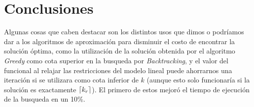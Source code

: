 \section{Conclusiones}

Algunas cosas que caben destacar son los distintos usos que dimos o podr\'iamos
dar a los algoritmos de aproximaci\'on para disminuir el costo de encontrar la
soluci\'on \'optima, como la utilizaci\'on de la soluci\'on obtenida por el
algoritmo \textit{Greedy} como cota superior en la busqueda por
\textit{Backtracking}, y el valor del funcional al relajar las restricciones
del modelo lineal puede ahorrarnos una iteraci\'on si se utilizara como cota
inferior de $k$ (aunque esto solo funcionar\'ia si la soluci\'on es exactamente
$\lceil k_r\rceil$). El primero de estos mejor\'o el tiempo de ejecuci\'on de la
busqueda en un 10\%.

